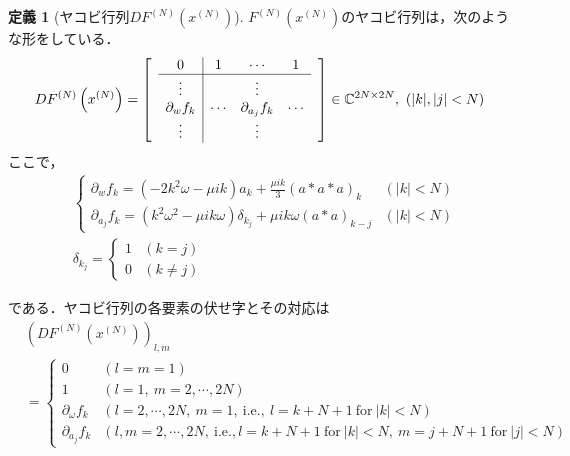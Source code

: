 \documentclass[11pt,a4paper,titlepage]{jsreport}
\theoremstyle{definition}
\newtheorem{dfn}{定義}
\begin{document}
\begin{dfn}[ヤコビ行列$DF^{(N)}\left(x^{(N)}\right)$]
  $F^{(N)}\left(x^{(N)}\right)$のヤコビ行列は，次のような形をしている．
  \begin{equation*}
    DF^{(N)}\left(x^{(N)}\right)=\begin{bmatrix}
       & \multicolumn{1}{c|}{0}              & 1      & \cdots            & 1      & \\ \cline{2-5}
       & \multicolumn{1}{c|}{\vdots}         &        & \vdots            &        & \\
       & \multicolumn{1}{c|}{\partial_w f_k} & \cdots & \partial_{a_j}f_k & \cdots & \\
       & \multicolumn{1}{c|}{\vdots}         &        & \vdots            &        & \\
    \end{bmatrix}
    \in \mathbb{C}^{2N\times 2N},\ \left(|k|,|j|<N\right)
  \end{equation*}
  ここで，
  \begin{align*}
     & \begin{cases}
         \partial_w f_k = (-2k^2\omega - \mu ik)a_k + \frac{\mu ik}{3}(a*a*a)_k                     & (|k|<N) \\
         \partial_{a_j} f_k = (k^2\omega^2 - \mu ik\omega)\delta_{k_j} + \mu ik\omega(a*a)_{k-j} & (|k|<N)
       \end{cases}
    \\
     & \delta_{k_j} = \begin{cases}
                        1 & (k=j)     \\
                        0 & (k\neq j)
                      \end{cases}
  \end{align*}
\end{dfn}
である．ヤコビ行列の各要素の伏せ字とその対応は
\begin{align*}
   & \left(DF^{(N)}\left(x^{(N)}\right)\right)_{l,m}                                                                                        \\
   & = \begin{cases}
         0                   & \left(l=m=1\right)                                                                                             \\
         1                   & \left(l=1,\ m= 2,\cdots,2N\right)                                                                              \\
         \partial_\omega f_k & \left(l=2,\cdots,2N,\ m=1, \ \mathrm{i.e.},\ l=k+N+1 \ \mathrm{for} \ |k|<N\right)                             \\
         \partial_{a_j}f_k   & \left(l,m=2,\cdots,2N, \ \mathrm{i.e.}, l=k+N+1 \ \mathrm{for} \ |k|<N,\ m=j+N+1 \ \mathrm{for} \ |j|<N\right)
       \end{cases}
\end{align*}
\end{document}
